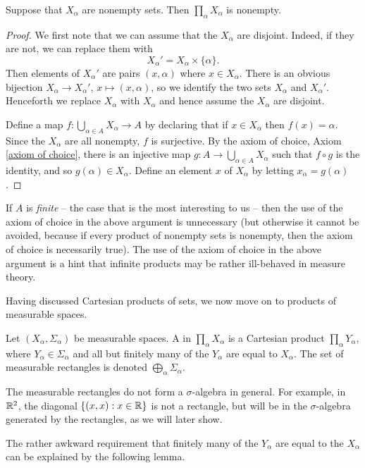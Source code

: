 \begin{lemma}
Suppose that $X_\alpha$ are nonempty sets. Then $\prod_{\alpha} X_\alpha$ is nonempty.
\end{lemma}
\begin{proof}
We first note that we can assume that the $X_\alpha$ are disjoint. Indeed, if they are not, we can replace them with
\[X_\alpha' = X_{\alpha} \times \{\alpha\}.\]
Then elements of $X_\alpha'$ are pairs $(x, \alpha)$ where $x \in X_\alpha$.
There is an obvious bijection $X_{\alpha} \to X_\alpha'$, $x \mapsto (x, \alpha)$, so we identify the two sets $X_\alpha$ and $X_\alpha'$.
Henceforth we replace $X_\alpha$ with $X_\alpha$ and hence assume the $X_\alpha$ are disjoint.

Define a map $f: \bigcup_{\alpha \in A} X_{\alpha} \to A$ by declaring that if $x \in X_\alpha$ then $f(x) = \alpha$.
Since the $X_\alpha$ are all nonempty, $f$ is surjective.
By the axiom of choice, Axiom \ref{axiom of choice}, there is an injective map $g: A \to \bigcup_{\alpha \in A} X_\alpha$ such that $f \circ g$ is the identity, and so $g(\alpha) \in X_\alpha$.
Define an element $x$ of $X_\alpha$ by letting $x_{\alpha} = g(\alpha)$.
\end{proof}
If $A$ is \emph{finite} -- the case that is the most interesting to us -- then the use of the axiom of choice in the above argument is unnecessary (but otherwise it cannot be avoided, because if every product of nonempty sets is nonempty, then the axiom of choice is necessarily true).
The use of the axiom of choice in the above argument is a hint that infinite products may be rather ill-behaved in measure theory.

Having discussed Cartesian products of sets, we now move on to products of measurable spaces.
\begin{definition}
Let $(X_\alpha, \Sigma_\alpha)$ be measurable spaces.
A  in $\prod_{\alpha} X_\alpha$ is a Cartesian product $\prod_{\alpha} Y_\alpha$, where $Y_{\alpha} \in \Sigma_\alpha$ and all but finitely many of the $Y_\alpha$ are equal to $X_\alpha$.
The set of measurable rectangles is denoted $\bigoplus_{\alpha} \Sigma_\alpha$.
\end{definition}

The measurable rectangles do not form a $\sigma$-algebra in general.
For example, in $\mathbb{R}^2$, the diagonal $\{(x, x): x \in \mathbb{R}\}$ is not a rectangle, but will be in the $\sigma$-algebra generated by the rectangles, as we will later show.

The rather awkward requirement that finitely many of the $Y_\alpha$ are equal to the $X_\alpha$ can be explained by the following lemma.

